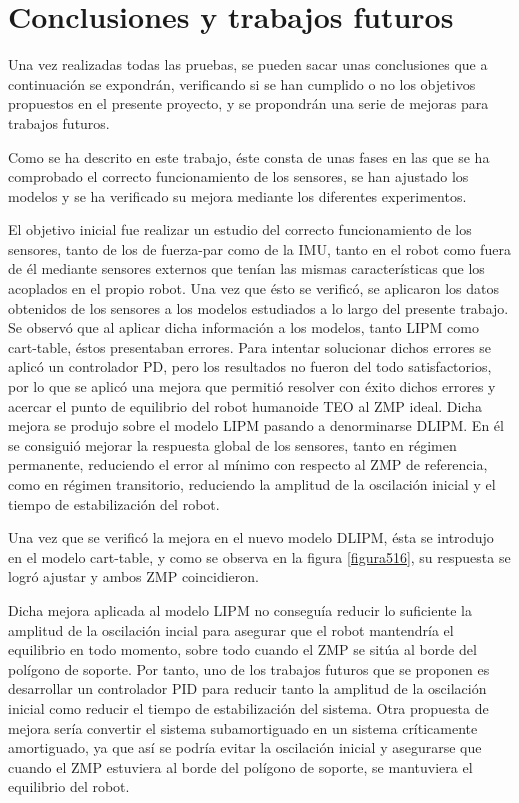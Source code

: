 \section{Conclusiones y trabajos futuros}

Una vez realizadas todas las pruebas, se pueden sacar unas conclusiones que a continuación se expondrán, verificando si se han cumplido o no los objetivos propuestos en el presente proyecto, y se propondrán una serie de mejoras para trabajos futuros.

Como se ha descrito en este trabajo, éste consta de unas fases en las que se ha comprobado el correcto funcionamiento de los sensores, se han ajustado los modelos y se ha verificado su mejora mediante los diferentes experimentos. 

El objetivo inicial fue realizar un estudio del correcto funcionamiento de los sensores, tanto de los de fuerza-par como de la IMU, tanto en el robot como fuera de él mediante sensores externos que tenían las mismas características que los acoplados en el propio robot. Una vez que ésto se verificó, se aplicaron los datos obtenidos de los sensores a los modelos estudiados a lo largo del presente trabajo. Se observó que al aplicar dicha información a los modelos, tanto LIPM como cart-table, éstos presentaban errores. Para intentar solucionar dichos errores se aplicó un controlador PD, pero los resultados no fueron del todo satisfactorios, por lo que se aplicó una mejora que permitió resolver con éxito dichos errores y acercar el punto de equilibrio del robot humanoide TEO al ZMP ideal. Dicha mejora se produjo sobre el modelo LIPM pasando a denorminarse DLIPM. En él se consiguió mejorar la respuesta global de los sensores, tanto en régimen permanente, reduciendo el error al mínimo con respecto al ZMP de referencia, como en régimen transitorio, reduciendo la amplitud de la oscilación inicial y el tiempo de estabilización del robot.

Una vez que se verificó la mejora en el nuevo modelo DLIPM, ésta se introdujo en el modelo cart-table, y como se observa en la figura \ref{figura516}, su respuesta se logró ajustar y ambos ZMP coincidieron.

Dicha mejora aplicada al modelo LIPM no conseguía reducir lo suficiente la amplitud de la oscilación incial para asegurar que el robot mantendría el equilibrio en todo momento, sobre todo cuando el ZMP se sitúa al borde del polígono de soporte. Por tanto, uno de los trabajos futuros que se proponen es desarrollar un controlador PID para reducir tanto la amplitud de la oscilación inicial como reducir el tiempo de estabilización del sistema. Otra propuesta de mejora sería convertir el sistema subamortiguado en un sistema críticamente amortiguado, ya que así se podría evitar la oscilación inicial y asegurarse que cuando el ZMP estuviera al borde del polígono de soporte, se mantuviera el equilibrio del robot.


\afterpage{\null\newpage}
\newpage